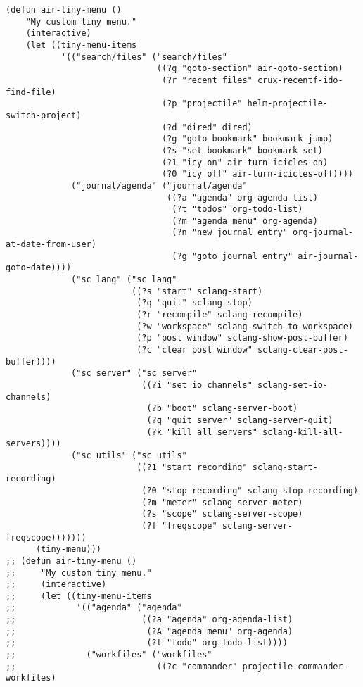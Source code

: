 \documentclass[11pt]{article}
\begin{document}
\begin{verbatim}
(defun air-tiny-menu ()
    "My custom tiny menu."
    (interactive)
    (let ((tiny-menu-items
           '(("search/files" ("search/files"
                              ((?g "goto-section" air-goto-section)
                               (?r "recent files" crux-recentf-ido-find-file)
                               (?p "projectile" helm-projectile-switch-project)
                               (?d "dired" dired)
                               (?g "goto bookmark" bookmark-jump)
                               (?s "set bookmark" bookmark-set)
                               (?1 "icy on" air-turn-icicles-on)
                               (?0 "icy off" air-turn-icicles-off))))
             ("journal/agenda" ("journal/agenda"
                                ((?a "agenda" org-agenda-list)
                                 (?t "todos" org-todo-list)
                                 (?m "agenda menu" org-agenda)
                                 (?n "new journal entry" org-journal-at-date-from-user)
                                 (?g "goto journal entry" air-journal-goto-date))))
             ("sc lang" ("sc lang"
                         ((?s "start" sclang-start)
                          (?q "quit" sclang-stop)
                          (?r "recompile" sclang-recompile)
                          (?w "workspace" sclang-switch-to-workspace)
                          (?p "post window" sclang-show-post-buffer)
                          (?c "clear post window" sclang-clear-post-buffer))))
             ("sc server" ("sc server"
                           ((?i "set io channels" sclang-set-io-channels)
                            (?b "boot" sclang-server-boot)
                            (?q "quit server" sclang-server-quit)
                            (?k "kill all servers" sclang-kill-all-servers))))
             ("sc utils" ("sc utils"
                          ((?1 "start recording" sclang-start-recording)
                           (?0 "stop recording" sclang-stop-recording)
                           (?m "meter" sclang-server-meter)
                           (?s "scope" sclang-server-scope)
                           (?f "freqscope" sclang-server-freqscope)))))))
      (tiny-menu)))
;; (defun air-tiny-menu ()
;;     "My custom tiny menu."
;;     (interactive)
;;     (let ((tiny-menu-items
;;            '(("agenda" ("agenda"
;;                         ((?a "agenda" org-agenda-list)
;;                          (?A "agenda menu" org-agenda)
;;                          (?t "todo" org-todo-list))))
;;              ("workfiles" ("workfiles"
;;                            ((?c "commander" projectile-commander-workfiles)

\end{verbatim}
\end{document}
